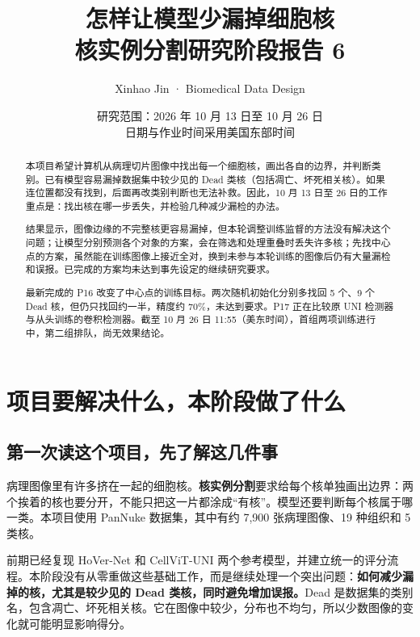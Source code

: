 \documentclass[UTF8,zihao=-4,fontset=windows]{ctexart}
\title{\bfseries 怎样让模型少漏掉细胞核\\[8pt]\Large 核实例分割研究阶段报告 6}
\author{Xinhao Jin · Biomedical Data Design}
\date{研究范围：2026 年 10 月 13 日至 10 月 26 日\\日期与作业时间采用美国东部时间}
\begin{document}
\maketitle
\begin{abstract}
本项目希望计算机从病理切片图像中找出每一个细胞核，画出各自的边界，并判断类别。已有模型容易漏掉数据集中较少见的 Dead 类核（包括凋亡、坏死相关核）。如果连位置都没有找到，后面再改类别判断也无法补救。因此，10 月 13 日至 26 日的工作重点是：找出核在哪一步丢失，并检验几种减少漏检的办法。

结果显示，图像边缘的不完整核更容易漏掉，但本轮调整训练监督的方法没有解决这个问题；让模型分别预测各个对象的方案，会在筛选和处理重叠时丢失许多核；先找中心点的方案，虽然能在训练图像上接近全对，换到未参与本轮训练的图像后仍有大量漏检和误报。已完成的方案均未达到事先设定的继续研究要求。

最新完成的 P16 改变了中心点的训练目标。两次随机初始化分别多找回 5 个、9 个 Dead 核，但仍只找回约一半，精度约 70\%，未达到要求。P17 正在比较原 UNI 检测器与从头训练的卷积检测器。截至 10 月 26 日 11:55（美东时间），首组两项训练进行中，第二组排队，尚无效果结论。

\end{abstract}

\newpage
{\small\tableofcontents}
\newpage

\section{项目要解决什么，本阶段做了什么}

\subsection{第一次读这个项目，先了解这几件事}

病理图像里有许多挤在一起的细胞核。\textbf{核实例分割}要求给每个核单独画出边界：两个挨着的核也要分开，不能只把这一片都涂成“有核”。模型还要判断每个核属于哪一类。本项目使用 PanNuke 数据集，其中有约 7,900 张病理图像、19 种组织和 5 类核。

前期已经复现 HoVer-Net 和 CellViT-UNI 两个参考模型，并建立统一的评分流程。本阶段没有从零重做这些基础工作，而是继续处理一个突出问题：\textbf{如何减少漏掉的核，尤其是较少见的 Dead 类核，同时避免增加误报。}Dead 是数据集的类别名，包含凋亡、坏死相关核。它在图像中较少，分布也不均匀，所以少数图像的变化就可能明显影响得分。
\end{document}
